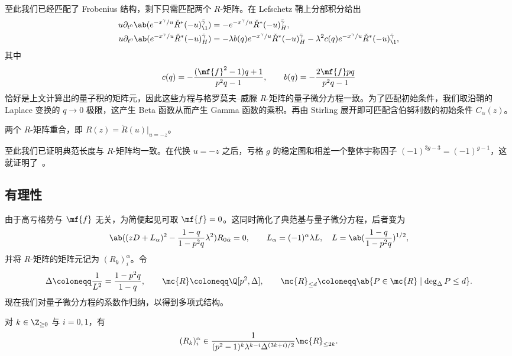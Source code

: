 至此我们已经匹配了 Frobenius 结构，剩下只需匹配两个 \(R\)-矩阵。在 Lefschetz 鞘上分部积分给出
\begin{align*}
    u \partial_{t^0}\ab(e^{-x^{\gamma}/u}\check{R}^*(-u)^{\bar{\gamma}}_{\1}) &= -e^{-x^{\gamma}/u}\check{R}^*(-u)^{\bar{\gamma}}_H, \\
    u\partial_{t^0}\ab(e^{-x^{\gamma}/u}\check{R}^*(-u)^{\bar{\gamma}}_H) &= -\lambda b(q)e^{-x^{\gamma}/u}\check{R}^*(-u)^{\bar{\gamma}}_H - \lambda^2 c(q) e^{-x^{\gamma}/u}\check{R}^*(-u)^{\bar{\gamma}}_{\1},
\end{align*}
其中
\[ c(q) = -\frac{(\mf{f}^2-1)q+1}{p^2q-1}, \qquad b(q) = -\frac{2\mf{f}pq}{p^2q-1} \]
恰好是上文计算出的量子积的矩阵元，因此这些方程与格罗莫夫–威滕 \(R\)-矩阵的量子微分方程一致。为了匹配初始条件，我们取沿鞘的 Laplace 变换的 \(q \to 0\) 极限，这产生 Beta 函数从而产生 Gamma 函数的乘积。再由 Stirling 展开即可匹配含伯努利数的初始条件 \(C_{\alpha}(z)\)。

\begin{prop}%
\label{prop:R matrices coincide}
    两个 \(R\)-矩阵重合，即 \(R(z) = \check{R}(u)|_{u=-z}\)。
\end{prop}

至此我们已证明典范长度与 \(R\)-矩阵均一致。在代换 \(u = -z\) 之后，亏格 \(g\) 的稳定图和相差一个整体宇称因子 \((-1)^{3g-3} = (-1)^{g-1}\)，这就证明了~。

\subsection{有理性}%
\label{sub:Rationality}

由于高亏格势与 \(\mf{f}\) 无关，为简便起见可取 \(\mf{f} = 0\)。这同时简化了典范基与量子微分方程，后者变为
\[ \ab((zD+L_{\alpha})^2 - \frac{1-q}{1-p^2q}\lambda^2)R_{0\bar{\alpha}} = 0, \qquad L_{\alpha} = (-1)^{\alpha}\lambda L, \quad L = \ab(\frac{1-q}{1-p^2q})^{1/2}, \]
并将 \(R\)-矩阵的矩阵元记为 \((R_k)_i^{\alpha}\)。令
\[ \Delta \coloneqq \frac{1}{L^2} = \frac{1-p^2q}{1-q}, \qquad \mc{R} \coloneqq \Q[p^2,\Delta], \qquad \mc{R}_{\leq d} \coloneqq \ab\{P \in \mc{R} \mid \deg_{\Delta} P \leq d\}. \]
现在我们对量子微分方程的系数作归纳，以得到多项式结构。

\begin{prop}%
\label{prop:R matrix polynomiality}
    对 \(k \in \Z_{\geq0}\) 与 \(i = 0,1\)，有
    \[ (R_k)_i^{\alpha} \in \frac{1}{(p^2-1)^k \lambda^{k-i}\Delta^{(3k+i)/2}}\mc{R}_{\leq 2k}. \]
\end{prop}

